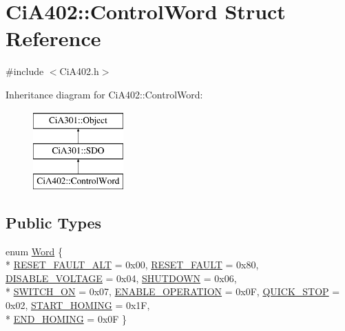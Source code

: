 \hypertarget{struct_ci_a402_1_1_control_word}{}\section{Ci\+A402\+:\+:Control\+Word Struct Reference}
\label{struct_ci_a402_1_1_control_word}


{\ttfamily \#include $<$Ci\+A402.\+h$>$}

Inheritance diagram for Ci\+A402\+:\+:Control\+Word\+:\begin{figure}[H]
\begin{center}
\leavevmode
\includegraphics[height=3.000000cm]{db/dc0/struct_ci_a402_1_1_control_word}
\end{center}
\end{figure}
\subsection*{Public Types}
\begin{DoxyCompactItemize}
\item 
enum \hyperlink{struct_ci_a402_1_1_control_word_a4c55c383fb4ebea7f52beaea4d232117}{Word} \{ \\*
\hyperlink{struct_ci_a402_1_1_control_word_a4c55c383fb4ebea7f52beaea4d232117ab30005008b50d9507b743ca643420b3f}{R\+E\+S\+E\+T\+\_\+\+F\+A\+U\+L\+T\+\_\+\+A\+L\+T} = 0x00, 
\hyperlink{struct_ci_a402_1_1_control_word_a4c55c383fb4ebea7f52beaea4d232117a77baf485c83cefe07d3a20b09fae96c9}{R\+E\+S\+E\+T\+\_\+\+F\+A\+U\+L\+T} = 0x80, 
\hyperlink{struct_ci_a402_1_1_control_word_a4c55c383fb4ebea7f52beaea4d232117a6c917260d94a8de3e819af4c0263b444}{D\+I\+S\+A\+B\+L\+E\+\_\+\+V\+O\+L\+T\+A\+G\+E} = 0x04, 
\hyperlink{struct_ci_a402_1_1_control_word_a4c55c383fb4ebea7f52beaea4d232117a37ab2e6269aab87f52a97a8e416c61a5}{S\+H\+U\+T\+D\+O\+W\+N} = 0x06, 
\\*
\hyperlink{struct_ci_a402_1_1_control_word_a4c55c383fb4ebea7f52beaea4d232117a45c421bdf4ca74136d75749746e43633}{S\+W\+I\+T\+C\+H\+\_\+\+O\+N} = 0x07, 
\hyperlink{struct_ci_a402_1_1_control_word_a4c55c383fb4ebea7f52beaea4d232117ace0f737e010c25afdb7c0dc492ae9418}{E\+N\+A\+B\+L\+E\+\_\+\+O\+P\+E\+R\+A\+T\+I\+O\+N} = 0x0\+F, 
\hyperlink{struct_ci_a402_1_1_control_word_a4c55c383fb4ebea7f52beaea4d232117a2af57338e221c820d9b185377892546c}{Q\+U\+I\+C\+K\+\_\+\+S\+T\+O\+P} = 0x02, 
\hyperlink{struct_ci_a402_1_1_control_word_a4c55c383fb4ebea7f52beaea4d232117a9e9cf2581d933a889fcf6fe930ae2cf5}{S\+T\+A\+R\+T\+\_\+\+H\+O\+M\+I\+N\+G} = 0x1\+F, 
\\*
\hyperlink{struct_ci_a402_1_1_control_word_a4c55c383fb4ebea7f52beaea4d232117a36c382a0047273e3341c4f63b041d544}{E\+N\+D\+\_\+\+H\+O\+M\+I\+N\+G} = 0x0\+F
 \}
\end{DoxyCompactItemize}
